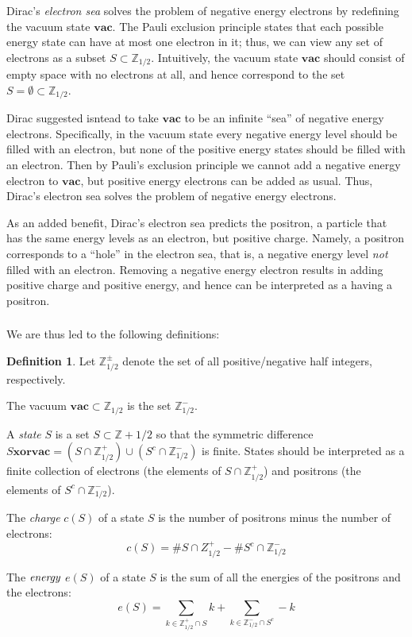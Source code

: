 \documentclass{amsart}[12pt]
\theoremstyle{definition}
\newtheorem{definition}[dummy]{Definition}
\newcommand{\Z}{\mathbb{Z}}
\newcommand{\vac}{\mathbf{vac}}
\begin{document}
Dirac's \emph{electron sea} solves the problem of negative energy electrons by redefining the vacuum state $\vac$.  The Pauli exclusion principle states that each possible energy state can have at most one electron in it; thus, we can view any set of electrons as a subset $S\subset \Z_{1/2}$.  Intuitively, the vacuum state $\vac$ should consist of empty space with no electrons at all, and hence correspond to the set $S=\emptyset\subset\Z_{1/2}$.

Dirac suggested isntead to take $\vac$ to be an
infinite ``sea'' of negative energy electrons.   Specifically, in the vacuum state every negative energy level should be filled with an electron, but none of the positive energy states should be filled with an electron.  Then by Pauli's
exclusion principle we cannot add a negative energy electron
to $\vac$, but positive energy electrons can be added as usual.  Thus, Dirac's electron sea solves the problem of negative energy electrons.

As an added benefit, Dirac's electron sea predicts the positron, a particle
that has the same energy levels as an electron, but positive charge.  Namely, a positron corresponds to a ``hole'' in the electron sea, that is, a negative
energy level \emph{not} filled with an electron.  Removing a negative energy electron results in adding positive charge and positive energy, and hence can be interpreted as a having a positron.

\subsubsection{} We are thus led to the following definitions:

\begin{definition} Let $\Z_{1/2}^\pm$ denote the set of all positive/negative half integers, respectively.

The vacuum $\vac\subset \Z_{1/2}$ is the set $\Z_{1/2}^-$.

A \emph{state} $S$ is a set $S\subset\Z+1/2$ so that the symmetric
difference $S \textbf{xor} \vac=(S\cap\Z_{1/2}^+)\cup (S^c\cap\Z_{1/2}^-)$ is finite.  States should be interpreted as a finite collection of electrons (the elements of $S\cap \Z^+_{1/2}$) and positrons (the elements of $S^c\cap \Z^-_{1/2}$).

The \emph{charge} $c(S)$ of a state $S$ is the number of positrons minus the number of electrons:
$$c(S)=\# S\cap Z^+_{1/2} - \# S^c\cap \Z^-_{1/2}$$

The $\emph{energy}$ $e(S)$ of a state $S$ is the sum of all the energies of the positrons and the electrons:
$$e(S)=\sum_{k\in\Z^+_{1/2}\cap S} k +\sum_{k\in\Z^-_{1/2}\cap S^c} -k$$

\end{definition}
\end{document}
